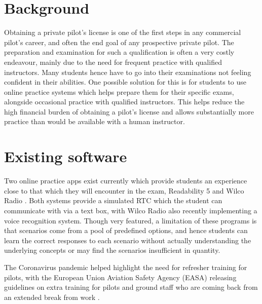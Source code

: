 \section{Background}
Obtaining a private pilot's license is one of the first steps in any commercial pilot's career, and often the end goal of any prospective private pilot.
The preparation and examination for such a qualification is often a very costly endeavour, mainly due to the need for frequent practice with qualified instructors.
Many students hence have to go into their examinations not feeling confident in their abilities.
One possible solution for this is for students to use online practice systems which helps prepare them for their specific exams, alongside occasional practice with qualified instructors.
This helps reduce the high financial burden of obtaining a pilot's license and allows substantially more practice than would be available with a human instructor.
\section{Existing software}
Two online practice apps exist currently which provide students an experience close to that which they will encounter in the exam, Readability 5 \cite{readability5} and Wilco Radio \cite{wilcoradio}.
Both systems provide a simulated RTC which the student can communicate with via a text box, with Wilco Radio also recently implementing a voice recognition system.
Though very featured, a limitation of these programs is that scenarios come from a pool of predefined options, and hence students can learn the correct responses to each scenario without actually understanding the underlying concepts or may find the scenarios insufficient in quantity.

The Coronavirus pandemic helped highlight the need for refresher training for pilots, with the European Union Aviation Safety Agency (EASA) releasing guidelines on extra training for pilots and ground staff who are coming back from an extended break from work \cite{EASA-training-post-covid}.